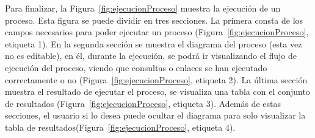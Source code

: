 Para finalizar, la Figura~\ref{fig:ejecucionProceso} muestra la ejecución de un proceso. Esta figura se puede dividir en tres secciones. La primera consta de los campos necesarios para poder ejecutar un proceso (Figura~\ref{fig:ejecucionProceso}, etiqueta 1). En la segunda sección se muestra el diagrama del proceso (esta vez no es editable), en él, durante la ejecución, se podrá ir visualizando el flujo de ejecución del proceso, viendo que consultas o enlaces se han ejecutado correctamente o no (Figura~\ref{fig:ejecucionProceso}, etiqueta 2). La última sección muestra el resultado de ejecutar el proceso, se visualiza una tabla con el conjunto de resultados (Figura~\ref{fig:ejecucionProceso}, etiqueta 3). Además de estas secciones, el usuario si lo desea puede ocultar el diagrama para solo visualizar la tabla de resultados(Figura~\ref{fig:ejecucionProceso}, etiqueta 4).




